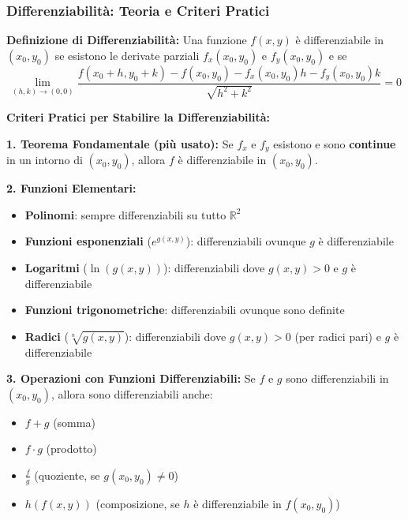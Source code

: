 \subsubsection{Differenziabilità: Teoria e Criteri Pratici}

\begin{info}
\textbf{Definizione di Differenziabilità:}
Una funzione $f(x,y)$ è differenziabile in $(x_0, y_0)$ se esistono le derivate parziali $f_x(x_0,y_0)$ e $f_y(x_0,y_0)$ e se
\[
\lim_{(h,k) \to (0,0)} \frac{f(x_0+h, y_0+k) - f(x_0,y_0) - f_x(x_0,y_0)h - f_y(x_0,y_0)k}{\sqrt{h^2+k^2}} = 0
\]
\end{info}

\begin{strategia}
\textbf{Criteri Pratici per Stabilire la Differenziabilità:}

\textbf{1. Teorema Fondamentale (più usato):}
Se $f_x$ e $f_y$ esistono e sono \textbf{continue} in un intorno di $(x_0,y_0)$, allora $f$ è differenziabile in $(x_0,y_0)$.

\textbf{2. Funzioni Elementari:}
\begin{itemize}
    \item \textbf{Polinomi}: sempre differenziabili su tutto $\mathbb{R}^2$
    \item \textbf{Funzioni esponenziali} ($e^{g(x,y)}$): differenziabili ovunque $g$ è differenziabile
    \item \textbf{Logaritmi} ($\ln(g(x,y))$): differenziabili dove $g(x,y) > 0$ e $g$ è differenziabile
    \item \textbf{Funzioni trigonometriche}: differenziabili ovunque sono definite
    \item \textbf{Radici} ($\sqrt[n]{g(x,y)}$): differenziabili dove $g(x,y) > 0$ (per radici pari) e $g$ è differenziabile
\end{itemize}

\textbf{3. Operazioni con Funzioni Differenziabili:}
Se $f$ e $g$ sono differenziabili in $(x_0,y_0)$, allora sono differenziabili anche:
\begin{itemize}
    \item $f + g$ (somma)
    \item $f \cdot g$ (prodotto)
    \item $\frac{f}{g}$ (quoziente, se $g(x_0,y_0) \neq 0$)
    \item $h(f(x,y))$ (composizione, se $h$ è differenziabile in $f(x_0,y_0)$)
\end{itemize}
\end{strategia}

